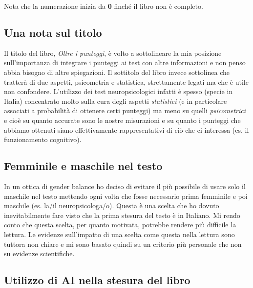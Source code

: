 \documentclass[
  italian,
  letterpaper,
  paper=6in:9in,
  pagesize=pdftex,
  headinclude=on,
  footinclude=on,
  11pt]{scrbook}
\begin{document}
Nota che la numerazione inizia da \textbf{0} finché il libro non è
completo.

\subsection*{Una nota sul titolo}\label{una-nota-sul-titolo}

Il titolo del libro, \emph{Oltre i punteggi}, è volto a sottolineare la
mia posizione sull'importanza di integrare i punteggi ai test con altre
informazioni e non penso abbia bisogno di altre spiegazioni. Il
sottitolo del libro invece sottolinea che tratterà di due aspetti,
psicometria e statistica, strettamente legati ma che è utile non
confondere. L'utilizzo dei test neuropsicologici infatti è spesso
(specie in Italia) concentrato molto sulla cura degli aspetti
\emph{statistici} (e in particolare associati a probabilità di ottenere
certi punteggi) ma meno su quelli \emph{psicometrici} e cioè su quanto
accurate sono le nostre misurazioni e su quanto i punteggi che abbiamo
ottenuti siano effettivamente rappresentativi di ciò che ci interessa
(es. il funzionamento cognitivo).

\subsection*{Femminile e maschile nel
testo}\label{femminile-e-maschile-nel-testo}

In un ottica di gender balance ho deciso di evitare il più possibile di
usare solo il maschile nel testo mettendo ogni volta che fosse
necessario prima femminile e poi maschile (es. la/il neuropsicologa/o).
Questa è una scelta che ho dovuto inevitabilmente fare visto che la
prima stesura del testo è in Italiano. Mi rendo conto che questa scelta,
per quanto motivata, potrebbe rendere più difficile la lettura. Le
evidenze sull'impatto di una scelta come questa nella lettura sono
tuttora non chiare e mi sono basato quindi su un criterio più personale
che non su evidenze scientifiche.

\subsection*{Utilizzo di AI nella stesura del
libro}\label{utilizzo-di-ai-nella-stesura-del-libro}
\end{document}
